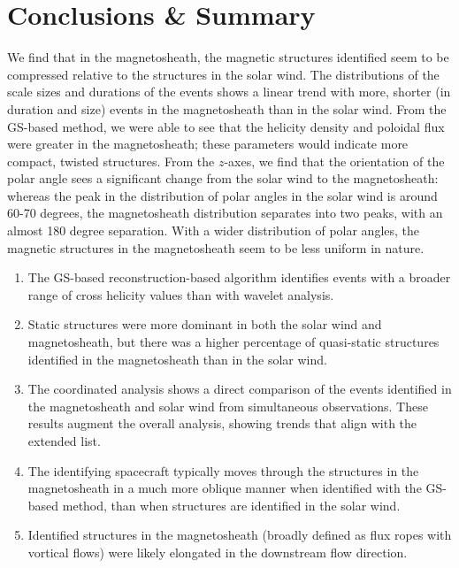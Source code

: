 \section{Conclusions \& Summary}

We find that in the magnetosheath, the magnetic structures identified seem to be compressed relative to the structures in the solar wind. The distributions of the scale sizes and durations of the events shows a linear trend with more, shorter (in duration and size) events in the magnetosheath than in the solar wind. From the GS-based method, we were able to see that the helicity density and poloidal flux were greater in the magnetosheath; these parameters would indicate more compact, twisted structures. From the $z$-axes, we find that the orientation of the polar angle sees a significant change from the solar wind to the magnetosheath: whereas the peak in the distribution of polar angles in the solar wind is around 60-70 degrees, the magnetosheath distribution separates into two peaks, with an almost 180 degree separation. With a wider distribution of polar angles, the magnetic structures in the magnetosheath seem to be less uniform in nature.

\begin{enumerate}
    \item The GS-based reconstruction-based algorithm identifies events with a broader range of cross helicity values than with wavelet analysis.
    \item Static structures were more dominant in both the solar wind and magnetosheath, but there was a higher percentage of quasi-static structures identified in the magnetosheath than in the solar wind. %
    \item The coordinated analysis shows a direct comparison of the events identified in the magnetosheath and solar wind from simultaneous observations. These results augment the overall analysis, showing trends that align with the extended list.
    \item The identifying spacecraft typically moves through the structures in the magnetosheath in a much more oblique manner when identified with the GS-based method, than when structures are identified in the solar wind.
    \item Identified structures in the magnetosheath (broadly defined as flux ropes with vortical flows) were likely elongated in the downstream flow direction.
\end{enumerate}